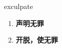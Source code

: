 
\begin{frame}
{\huge exculpate}
\begin{center}
\begin{enumerate}\Large
  \item \textbf{声明无罪}
  \item \textbf{开脱，使无罪}
\end{enumerate}
\end{center}
\end{frame}
